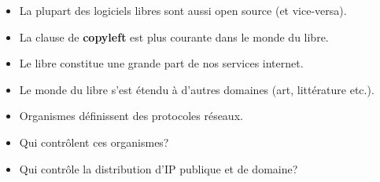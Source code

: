 \begin{slide}
	\begin{itemize}
		\item La plupart des logiciels libres sont aussi open source (et vice-versa).
		\item La clause de \textbf{copyleft} est plus courante dans le monde du libre.
		\item Le libre constitue une grande part de nos services internet.
		\item Le monde du libre s'est étendu à d'autres domaines (art, littérature etc.).
	\end{itemize}
\end{slide}

\begin{slide}
	\begin{itemize}
		\item Organismes définissent des protocoles réseaux.
		\item Qui contrôlent ces organismes?
		\item Qui contrôle la distribution d'IP publique et de domaine?
	\end{itemize}
\end{slide}